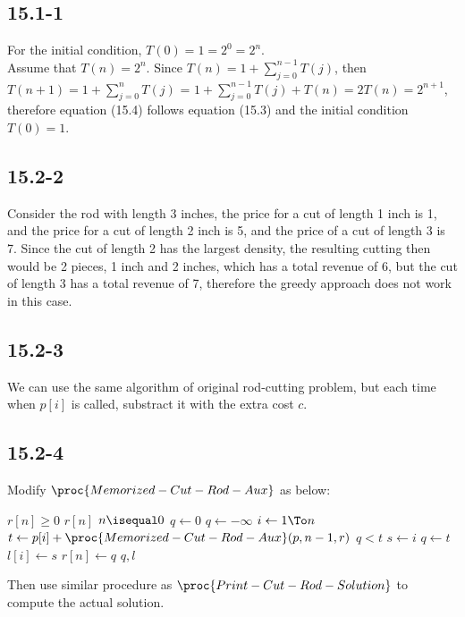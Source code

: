 \subsection{15.1-1}
    For the initial condition, $T(0) = 1 = 2^0 = 2^n$. \\
    Assume that $T(n) = 2^n$. Since $T(n) = 1 + \sum_{j = 0}^{n-1}T(j)$, then
    $T(n+1) = 1 + \sum_{j = 0}^{n}T(j)$ = $1 + \sum_{j = 0}^{n - 1}T(j) + T(n)
    = 2T(n) = 2^{n+1}$, therefore equation (15.4) follows equation (15.3) and
    the initial condition $T(0) = 1$.
\subsection{15.2-2}
    Consider the rod with length 3 inches, the price for a cut of length 1
    inch is 1, and the price for a cut of length 2 inch is 5, and the price of
    a cut of length 3 is 7.  Since the cut of length 2 has the largest density,
    the resulting cutting then would be 2 pieces, 1 inch and 2 inches, which
    has a total revenue of 6, but the cut of length 3 has a total revenue of 7,
    therefore the greedy approach does not work in this case.
\subsection{15.2-3}
    We can use the same algorithm of original rod-cutting problem, but each
    time when $p[i]$ is called, substract it with the extra cost $c$.
\subsection{15.2-4}
    Modify $\proc{Memorized-Cut-Rod-Aux}$ as below:
    \begin{codebox}
        \li \If $r[n] \ge 0$
            \Then
        \li     \Return $r[n]$
            \End
        \li \If $n \isequal 0$
            \Then
        \li     $q \gets 0$
        \li \Else $q \gets -\infty$
        \li     \For $i \gets 1 \To n$
                \Do
        \li         $t \gets p[i] + \proc{Memorized-Cut-Rod-Aux}(p, n - 1, r)$
        \li         \If $q < t$
                    \Then
        \li             $s \gets i$
        \li             $q \gets t$
                    \End
        \li         $l[i] \gets s$
                \End
            \End
        \li $r[n] \gets q$
        \li \Return $q, l$
    \end{codebox}
    Then use similar procedure as $\proc{Print-Cut-Rod-Solution}$ to compute
    the actual solution.
